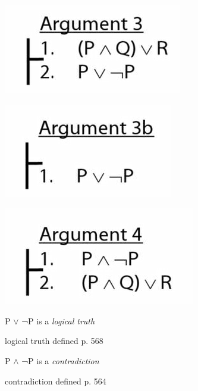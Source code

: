 \documentclass[12pt]{extarticle}
\begin{document}
\begin{multicols*}{3}
\begin{center}
\includegraphics[scale=0.3]{img/unit_160_argument3.png}
\end{center}
\begin{center}
\includegraphics[scale=0.3]{img/unit_160_argument3b.png}
\end{center}
\begin{center}
\includegraphics[scale=0.3]{img/unit_160_argument4.png}
\end{center}
P $\lor{}$ ¬P is a \emph{logical truth}
 
logical truth defined p. 568
 
P $\land{}$ ¬P is a \emph{contradiction}
 
contradiction defined p. 564
 



 


\end{multicols*}
\end{document}
